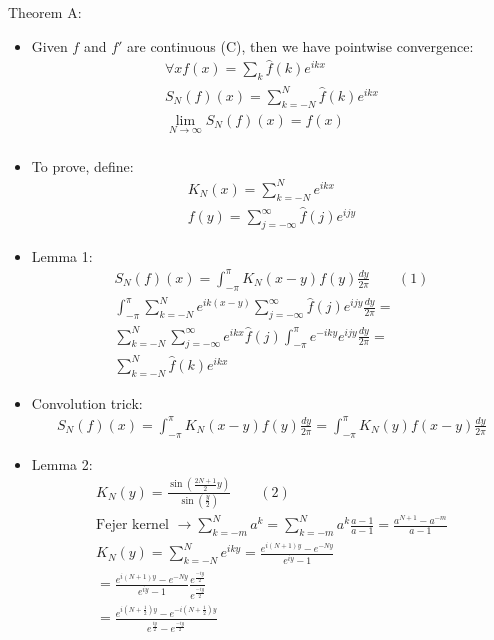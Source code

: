 \documentclass[12pt, a4paper]{article}
\begin{document}
Theorem A:
\begin{itemize}
    \item Given $f$ and $f'$ are continuous (C), then we have pointwise convergence:
    \begin{gather*}
        \forall x f(x) = \sum_k \hat{f}(k)e^{ikx}\\
        S_N(f)(x) = \sum_{k=-N}^N \hat{f}(k)e^{ikx}\\
        \lim_{N\to\infty} S_N(f)(x) = f(x)\\
    \end{gather*}
    \item To prove, define:
    \begin{gather*}
        K_N(x) = \sum_{k=-N}^Ne^{ikx} \\
        f(y) = \sum_{j=-\infty}^\infty \hat{f}(j)e^{ijy}
    \end{gather*}
    \item Lemma 1:
    \begin{gather*}
        S_N(f)(x) = \int_{-\pi}^\pi K_N(x-y)f(y)\frac{dy}{2\pi} \qquad (1)\\
        \int_{-\pi}^\pi \sum_{k=-N}^Ne^{ik(x-y)}\sum_{j=-\infty}^\infty \hat{f}(j)e^{ijy}\frac{dy}{2\pi}=\\
        \sum_{k=-N}^N\sum_{j=-\infty}^\infty e^{ikx} \hat{f}(j)\int_{-\pi}^\pi e^{-iky}e^{ijy}\frac{dy}{2\pi}=\\
        \sum_{k=-N}^N \hat{f}(k)e^{ikx}
    \end{gather*}
    \item Convolution trick:
    \begin{gather*}
        S_N(f)(x) = \int_{-\pi}^\pi K_N(x-y)f(y)\frac{dy}{2\pi}=\int_{-\pi}^\pi K_N(y)f(x-y)\frac{dy}{2\pi}
    \end{gather*}
    \item Lemma 2:
    \begin{gather*}
        K_N(y) = \frac{\sin{\left(\frac{2N+1}{2}y\right)}}{\sin{\left(\frac{y}{2}\right)}} \qquad (2)\\
        \text{Fejer kernel }\rightarrow \sum_{k=-m}^N a^k = \sum_{k=-m}^N a^k\frac{a-1}{a-1} = \frac{a^{N+1}-a^{-m}}{a-1}\\
        K_N(y) = \sum_{k=-N}^Ne^{iky} = \frac{e^{i(N+1)y}-e^{-Ny}}{e^{iy}-1}\\
        = \frac{e^{i(N+1)y}-e^{-Ny}}{e^{iy}-1} \frac{e^{\frac{-iy}{2}}}{e^{\frac{-iy}{2}}}\\
        = \frac{e^{i(N+\frac{1}{2})y}-e^{-i(N+\frac{1}{2})y}}{e^{\frac{iy}{2}}-e^{\frac{-iy}{2}}}

\end{gather*}
\end{itemize}
\end{document}
